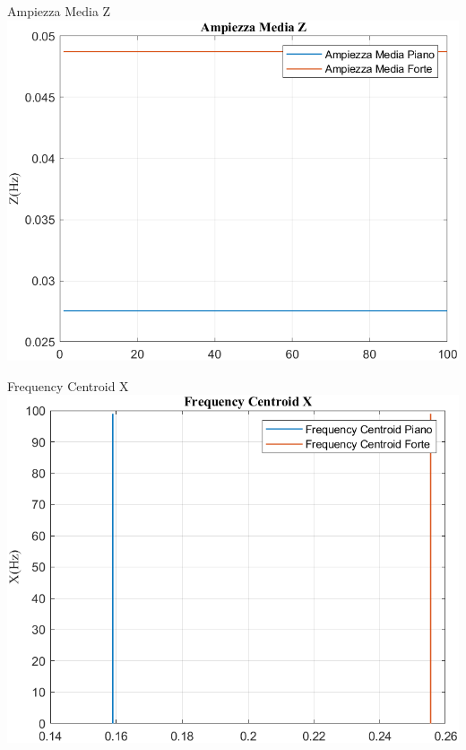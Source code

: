 	\begin{frame}{{Ampiezza Media Z}}					
		\centering\includegraphics[height=.8\textheight]{figure/Mag/Trasformata/Ampiezza MediaZ}
	\end{frame}
	
	\begin{frame}{{Frequency Centroid X}}
		\centering\includegraphics[height=.8\textheight]{figure/Mag/Trasformata/Frequency CentroidX}
	\end{frame}
	
